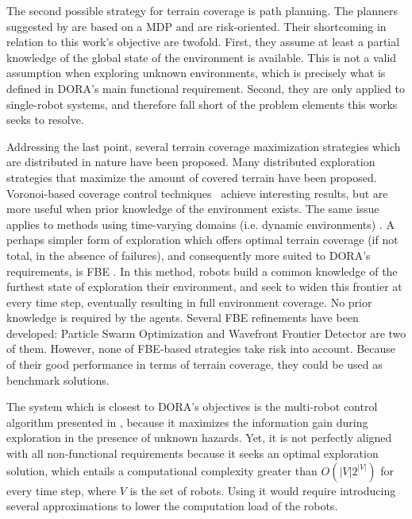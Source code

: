 The second possible strategy for terrain coverage is path planning. The planners suggested by \cite{undurti2010online,thiebaux2016rao,xiao2020robot} are based on a \ac{MDP} and are risk-oriented. Their shortcoming in relation to this work's objective are twofold. First, they assume at least a partial knowledge of the global state of the environment is available. This is not a valid assumption when exploring unknown environments, which  is precisely what is defined in \ac{DORA}'s main functional requirement. Second, they are only applied to single-robot systems, and therefore fall short of the problem elements this works seeks to resolve.

Addressing the last point, several terrain coverage maximization strategies which are distributed in nature have been proposed. Many distributed exploration strategies that maximize the amount of covered terrain have been proposed. Voronoi-based coverage control techniques~\cite{luo2019voronoi,santos2019decentralized} achieve interesting results, but are more useful when prior knowledge of the environment exists. The same issue applies to methods using time-varying domains (i.e. dynamic environments) \cite{santos2019decentralized,xu2019multi}. A perhaps simpler form of exploration which offers optimal terrain coverage (if not total, in the absence of failures), and consequently more suited to \ac{DORA}'s requirements, is \ac{FBE} \cite{yamauchi1998frontier}. In this method, robots build a common knowledge of the furthest state of exploration their environment, and seek to widen this frontier at every time step, eventually resulting in full environment coverage. No prior knowledge is required by the agents. Several \ac{FBE} refinements have been developed: Particle Swarm Optimization \cite{wang2011frontier} and Wavefront Frontier Detector \cite{topiwala2018frontier} are two of them. However, none of \ac{FBE}-based strategies take risk into account. Because of their good performance in terms of terrain coverage, they could be used as benchmark solutions.

The system which is closest to \ac{DORA}'s objectives is the multi-robot control algorithm presented in \cite{dames2012decentralized,schwagerMultirobotControlPolicy2017}, because it maximizes the information gain during exploration in the presence of unknown hazards. Yet, it is not perfectly aligned with all non-functional requirements because it seeks an optimal exploration solution, which entails a computational complexity greater than $O(|V|2^{|V|})$ for every time step, where $V$ is the set of robots. Using it would require introducing several approximations to lower the computation load of the robots.


